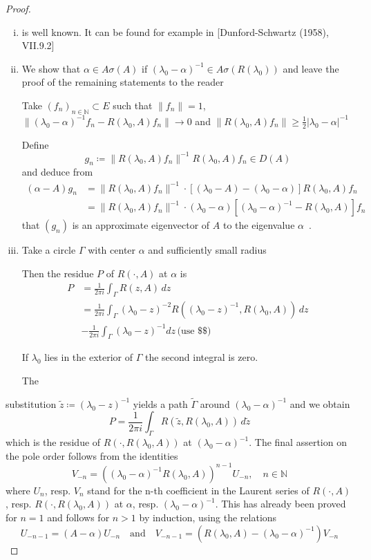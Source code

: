 \begin{proof}
	\begin{enumerate}[(i)]
		\item is well known. It can be found for example in [Dunford-Schwartz (1958), VII.9.2]
		
		\item We show that $\alpha \in A\sigma(A)$ if $(\lambda_{0}-\alpha)^{-1} \in A\sigma(R(\lambda_{0}))$ and leave the proof of the remaining statements to the reader
		
		Take $(f_{n})_{n \in \mathbb{N}} \subset E$ such that $\|f_{n}\| = 1$, $\|(\lambda_{0}-\alpha)^{-1}f_{n} - R(\lambda_{0},A)f_{n}\| \to 0$ and $\|R(\lambda_{0},A)f_{n}\| \geq \frac{1}{2}|\lambda_{0} - \alpha|^{-1}$
		
		Define
		\[
		g_{n} \coloneqq \|R(\lambda_{0},A)f_{n}\|^{-1}R(\lambda_{0},A)f_{n} \in D(A)
		\]
		and deduce from
		\begin{align*}
			(\alpha-A)g_{n} &= \|R(\lambda_{0},A)f_{n}\|^{-1} \cdot [(\lambda_{0}-A) - (\lambda_{0}-\alpha)]R(\lambda_{0},A)f_{n} \\
			&= \|R(\lambda_{0},A)f_{n}\|^{-1} \cdot (\lambda_{0}-\alpha)[(\lambda_{0}-\alpha)^{-1} - R(\lambda_{0},A)]f_{n}
		\end{align*}
		that $(g_{n})$ is an approximate eigenvector of $A$ to the eigenvalue $\alpha$~.
		
		\item Take a circle $\Gamma$ with center $\alpha$ and sufficiently small radius
		
		Then the residue $P$ of $R(\cdot,A)$ at $\alpha$ is
		\begin{align*}
			P &= \frac{1}{2\pi i} \int_{\Gamma} R(z,A) \, dz \\
			&= \frac{1}{2\pi i} \int_{\Gamma} (\lambda_{0}-z)^{-2}R((\lambda_{0}-z)^{-1},R(\lambda_{0},A)) \, dz \\
			&- \frac{1}{2\pi i} \int_{\Gamma}(\lambda_{0}-z)^{-1}dz \, \text{(use \$\$)}
		\end{align*}
		
		If $\lambda_{0}$ lies in the exterior of $\Gamma$ the second integral is zero.
		
		The
	\end{enumerate}

\newpage
substitution $\tilde{z} \coloneqq (\lambda_{0} - z)^{-1}$ yields a path $\tilde{\Gamma}$ around $(\lambda_{0}-\alpha)^{-1}$ and we obtain
\[
P = \frac{1}{2\pi i} \int_{\Gamma} R(\tilde{z},R(\lambda_{0},A)) \, d\tilde{z}
\]
which is the residue of $R(\cdot,R(\lambda_{0},A))$ at $(\lambda_{0}-\alpha)^{-1}$.
The final assertion on the pole order follows from the identities
\[
V_{-n} = ((\lambda_{0}-\alpha)^{-1}R(\lambda_{0},A))^{n-1}U_{-n}, \quad n \in \mathbb{N}
\]
where $U_{n}$, resp. $V_{n}$ stand for the n-th coefficient in the Laurent series of $R(\cdot,A)$, resp. $R(\cdot,R(\lambda_{0},A))$ at $\alpha$, resp. $(\lambda_{0}-\alpha)^{-1}$.
This has already been proved for $n = 1$ and follows for $n > 1$ by induction, using the relations
\[
U_{-n-1} = (A - \alpha)U_{-n} \quad \text{and} \quad V_{-n-1} = (R(\lambda_{0},A) - (\lambda_{0}-\alpha)^{-1})V_{-n}
\]


\end{proof}

